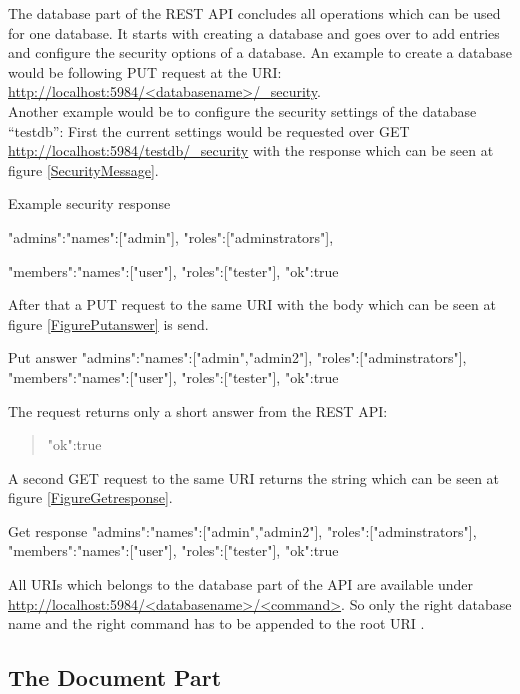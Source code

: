 The database part of the REST API concludes all operations which can be used for one database. It starts with creating a database and goes over to add entries and configure the security options of a database.
An example to create a database would be following PUT request at the URI:
\url{http://localhost:5984/<databasename>/_security}. \\
Another example would be to configure the security settings of the database “testdb”:
First the current settings would be requested over GET  \url{http://localhost:5984/testdb/_security} with the response which can be seen at figure \ref{SecurityMessage}.
\begin{mylisting}{\label{SecurityMessage}Example security response}
{
    {
        "admins":{"names":["admin"],
        "roles":["adminstrators"]},
        
        "members":{"names":["user"],
        "roles":["tester"]},
        "ok":true
    }
}
\end{mylisting} 
\newpage 
After that a PUT request to the same URI with the body which can be seen at figure \ref{FigurePutanswer} is send.
\begin{mylisting}{\label{FigurePutanswer} Put answer}
{
    {
        "admins":{"names":["admin","admin2"],
        "roles":["adminstrators"]},
        "members":{"names":["user"],
        "roles":["tester"]},
        "ok":true
    } 
}
\end{mylisting}
The request returns only a short answer from the REST API:\begin{quote}{"ok":true} \end{quote}
A second GET request to the same URI returns the string which can be seen at figure \ref{FigureGetresponse}. 
\begin{mylisting}{\label{FigureGetresponse} Get response}
{
    {
        "admins":{"names":["admin","admin2"],
        "roles":["adminstrators"]},
        "members":{"names":["user"],
        "roles":["tester"]},
        "ok":true
    }
}
\end{mylisting}
All URIs which belongs to the database part of the API are available under  \url{http://localhost:5984/<databasename>/<command>}. So only the right database name and the right command has to be appended to the root URI \cite{CouchDBRestDatabases}.

\subsection{The Document Part}

